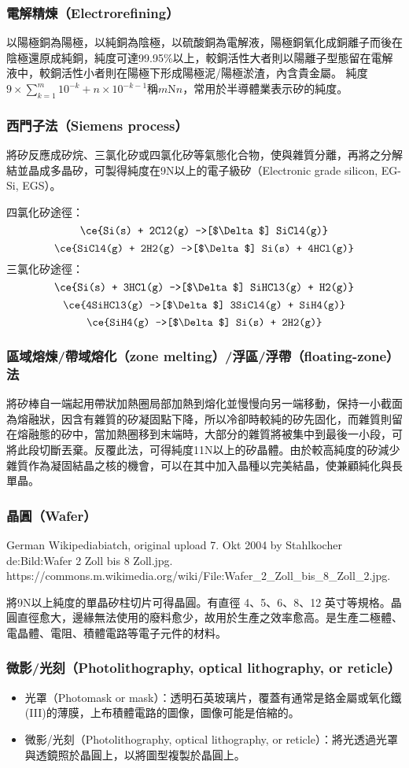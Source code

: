 \documentclass[a4paper,12pt]{report}
\begin{document}
\begin{itemize}
\subsubsection{電解精煉（Electrorefining）}
以陽極銅為陽極，以純銅為陰極，以硫酸銅為電解液，陽極銅氧化成銅離子而後在陰極還原成純銅，純度可達99.95\%以上，較銅活性大者則以陽離子型態留在電解液中，較銅活性小者則在陽極下形成陽極泥/陽極淤渣，內含貴金屬。
純度$9\times\sum_{k=1}^m10^{-k}+n\times10^{-k-1}$稱$m$N$n$，常用於半導體業表示矽的純度。
\subsubsection{西門子法（Siemens process）}
將矽反應成矽烷、三氯化矽或四氯化矽等氣態化合物，使與雜質分離，再將之分解結並晶成多晶矽，可製得純度在9N以上的電子級矽（Electronic grade silicon, EG-Si, EGS）。

四氯化矽途徑：
\[\ce{Si(s) + 2Cl2(g) ->[$\Delta$] SiCl4(g)}\]
\[\ce{SiCl4(g) + 2H2(g) ->[$\Delta$] Si(s) + 4HCl(g)}\]
三氯化矽途徑：
\[\ce{Si(s) + 3HCl(g) ->[$\Delta$] SiHCl3(g) + H2(g)}\]
\[\ce{4SiHCl3(g) ->[$\Delta$] 3SiCl4(g) + SiH4(g)}\]
\[\ce{SiH4(g) ->[$\Delta$] Si(s) + 2H2(g)}\]
\subsubsection{區域熔煉/帶域熔化（zone melting）/浮區/浮帶（floating-zone）法}
將矽棒自一端起用帶狀加熱圈局部加熱到熔化並慢慢向另一端移動，保持一小截面為熔融狀，因含有雜質的矽凝固點下降，所以冷卻時較純的矽先固化，而雜質則留在熔融態的矽中，當加熱圈移到末端時，大部分的雜質將被集中到最後一小段，可將此段切斷丟棄。反覆此法，可得純度11N以上的矽晶體。由於較高純度的矽減少雜質作為凝固結晶之核的機會，可以在其中加入晶種以完美結晶，使兼顧純化與長單晶。
\subsubsection{晶圓（Wafer）}
\bct\bfH\ctr{}\caption{German Wikipediabiatch, original upload 7. Okt 2004 by Stahlkocher de:Bild:Wafer 2 Zoll bis 8 Zoll.jpg. https://commons.m.wikimedia.org/wiki/File:Wafer\_2\_Zoll\_bis\_8\_Zoll\_2.jpg.}\ef\FB\ect
將9N以上純度的單晶矽柱切片可得晶圓。有直徑 4、5、6、8、12 英寸等規格。晶圓直徑愈大，邊緣無法使用的廢料愈少，故用於生產之效率愈高。是生產二極體、電晶體、電阻、積體電路等電子元件的材料。
\subsubsection{微影/光刻（Photolithography, optical lithography, or reticle）}
\begin{itemize}
\item 光罩（Photomask or mask）：透明石英玻璃片，覆蓋有通常是鉻金屬或氧化鐵(III)的薄膜，上布積體電路的圖像，圖像可能是倍縮的。
\item 微影/光刻（Photolithography, optical lithography, or reticle）：將光透過光罩與透鏡照於晶圓上，以將圖型複製於晶圓上。
\end{itemize}

\end{itemize}
\end{document}
